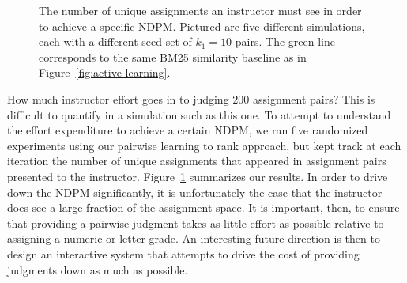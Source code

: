 \begin{figure}
  \begin{center}
  \caption{The number of unique assignments an instructor must see in order
  to achieve a specific NDPM. Pictured are five different simulations, each
  with a different seed set of $k_1 = 10$ pairs. The green line corresponds
  to the same BM25 similarity baseline as in
  Figure~\ref{fig:active-learning}.}
  \label{fig:num-examined}
  \end{center}
\end{figure}

How much instructor effort goes in to judging 200 assignment pairs? This is
difficult to quantify in a simulation such as this one. To attempt to
understand the effort expenditure to achieve a certain NDPM, we ran five
randomized experiments using our pairwise learning to rank approach, but
kept track at each iteration the number of unique assignments that appeared
in assignment pairs presented to the instructor.
Figure~\ref{fig:num-examined} summarizes our results. In order to drive
down the NDPM significantly, it is unfortunately the case that the
instructor does see a large fraction of the assignment space. It is
important, then, to ensure that providing a pairwise judgment takes as
little effort as possible relative to assigning a numeric or letter grade.
An interesting future direction is then to design an interactive system that
attempts to drive the cost of providing judgments down as much as possible.

